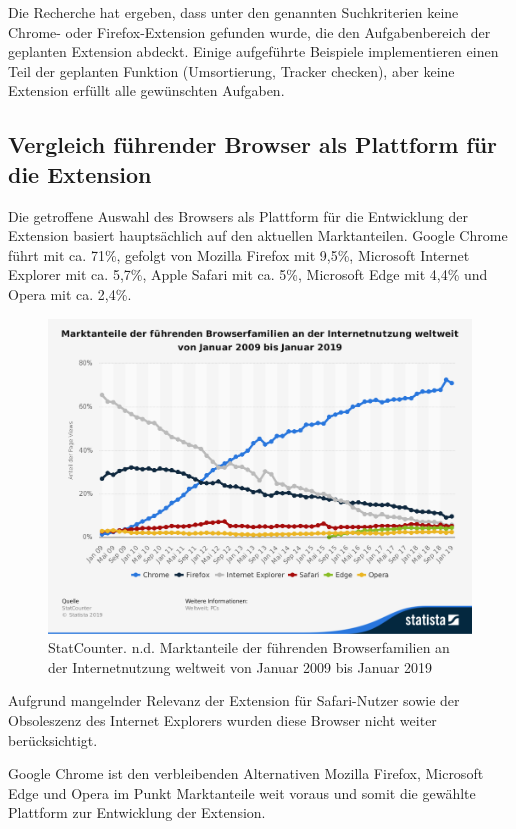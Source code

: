 Die Recherche hat ergeben, dass unter den genannten Suchkriterien keine Chrome- oder Firefox-Extension gefunden wurde, die den Aufgabenbereich der geplanten Extension abdeckt. Einige aufgeführte Beispiele implementieren einen Teil der geplanten Funktion (Umsortierung, Tracker checken), aber keine Extension erfüllt alle gewünschten Aufgaben.


\subsection{Vergleich führender Browser als Plattform für die Extension}
\label{ss:vergleichbrowser}
Die getroffene Auswahl des Browsers als Plattform für die Entwicklung der Extension basiert hauptsächlich auf den aktuellen Marktanteilen. Google Chrome führt mit ca. 71\%, gefolgt von Mozilla Firefox mit 9,5\%, Microsoft Internet Explorer mit ca. 5,7\%, Apple Safari mit ca. 5\%, Microsoft Edge mit 4,4\% und Opera mit ca. 2,4\%.

\begin{figure}[ht]
	\centering
	\includegraphics[width=1\textwidth]{pics/MarktanteileBrowser.png}
	\caption{StatCounter. n.d. Marktanteile der führenden Browserfamilien an der Internetnutzung weltweit von Januar 2009 bis Januar 2019\cite{stat1}}
	\label{marktanteilebrowser}
\end{figure}

Aufgrund mangelnder Relevanz der Extension für Safari-Nutzer sowie der Obsoleszenz des Internet Explorers wurden diese Browser nicht weiter berücksichtigt.

Google Chrome ist den verbleibenden Alternativen Mozilla Firefox, Microsoft Edge und Opera im Punkt Marktanteile weit voraus und somit die gewählte Plattform zur Entwicklung der Extension.

